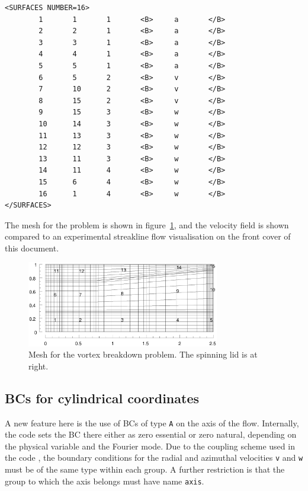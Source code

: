 \documentclass[11pt,a4paper]{report}
\begin{document}
{\begin{verbatim}
<SURFACES NUMBER=16>
        1       1       1       <B>     a       </B>
        2       2       1       <B>     a       </B>
        3       3       1       <B>     a       </B>
        4       4       1       <B>     a       </B>
        5       5       1       <B>     a       </B>
        6       5       2       <B>     v       </B>
        7       10      2       <B>     v       </B>
        8       15      2       <B>     v       </B>
        9       15      3       <B>     w       </B>
        10      14      3       <B>     w       </B>
        11      13      3       <B>     w       </B>
        12      12      3       <B>     w       </B>
        13      11      3       <B>     w       </B>
        14      11      4       <B>     w       </B>
        15      6       4       <B>     w       </B>
        16      1       4       <B>     w       </B>
</SURFACES>
\end{verbatim}
}

The mesh for the problem is shown in figure~\ref{vb1msh}, and the
velocity field is shown compared to an experimental streakline flow
visualisation on the front cover of this document.
\begin{figure}
\begin{center}
\includegraphics[width=0.75\textwidth]{vb1mesh.eps}
\end{center}
\caption{
\label{vb1msh}
  Mesh for the vortex breakdown problem.  The spinning lid is at right.
  }
\end{figure}

\subsection{BCs for cylindrical coordinates}

A new feature here is the use of BCs of type \verb+A+ on the axis of
the flow.  Internally, the code sets the BC there either as zero
essential or zero natural, depending on the physical variable and the
Fourier mode.  Due to the coupling scheme used in the code
\cite{tok93}, the boundary conditions for the radial and azimuthal
velocities \verb+v+ and \verb+w+ must be of the same type within each
group.  A further restriction is that the group to which the axis
belongs must have name \verb+axis+.
\end{document}
